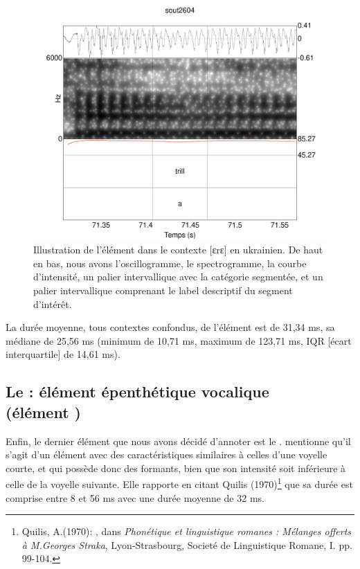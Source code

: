 \begin{figure}
	\centering
	\includegraphics[width=0.7\linewidth]{substance/spectro_images/sout2604_1312_ɛrɛ}
	\caption[Illustration de l'élément ]{Illustration de l'élément  dans le contexte [ɛrɛ] en ukrainien. De haut en bas, nous avons l'oscillogramme, le spectrogramme, la courbe d'intensité, un palier intervallique avec la catégorie segmentée, et un palier intervallique comprenant le label descriptif du segment d'intérêt.}
	\label{fig:sout26041312r}
\end{figure}

La durée moyenne, tous contextes confondus, de l'élément  est de 31,34 ms, sa médiane de 25,56 ms (minimum de 10,71 ms, maximum de 123,71 ms, IQR [écart interquartile] de 14,61 ms).


\subsection[Le \textg{c} : élément épenthétique vocalique]{Le  : élément épenthétique vocalique\\ (élément )}


Enfin, le dernier élément que nous avons décidé d'annoter est le . \textcite[38]{blecuaVibrantesEspanolManifestaciones2002} mentionne qu'il s'agit d'un élément avec des caractéristiques similaires à celles d'une voyelle courte, et qui possède donc des formants, bien que son intensité soit inférieure à celle de la voyelle suivante. Elle rapporte en citant Quilis (1970)\footnote{Quilis, A.(1970): , dans \textit{Phonétique et linguistique romanes : Mélanges offerts à M.Georges Straka}, Lyon-Strasbourg, Societé de Linguistique Romane, I. pp. 99-104.} que sa durée est comprise entre 8 et 56 ms avec une durée moyenne de 32 ms.\\

